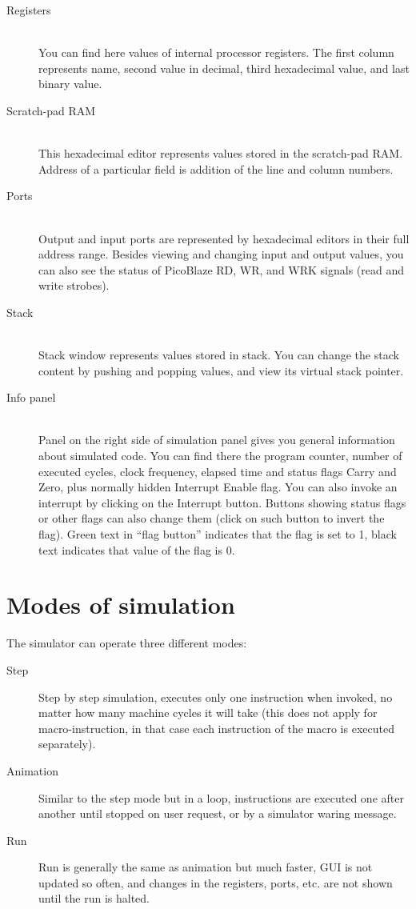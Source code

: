     \begin{description}
        \item [Registers]~\\
            You can find here values of internal processor registers. The first column represents name, second value in decimal, third hexadecimal value, and last binary value.
        \item [Scratch-pad RAM]~\\
            This hexadecimal editor represents values stored in the scratch-pad RAM. Address of a particular field is addition of the line and column numbers.
        \item [Ports]~\\
            Output and input ports are represented by hexadecimal editors in their full address range. Besides viewing and changing input and output values, you can also see the status of PicoBlaze RD, WR, and WRK signals (read and write strobes).
        \item [Stack]~\\
            Stack window represents values stored in stack. You can change the stack content by pushing and popping values, and view its virtual stack pointer.
        \item [Info panel]~\\
            Panel on the right side of simulation panel gives you general information about simulated code. You can find there the program counter, number of executed cycles, clock frequency, elapsed time and status flags Carry and Zero, plus normally hidden Interrupt Enable flag. You can also invoke an interrupt by clicking on the Interrupt button. Buttons showing status flags or other flags can also change them (click on such button to invert the flag). Green text in ``flag button'' indicates that the flag is set to 1, black text indicates that value of the flag is 0.
    \end{description}

\section{Modes of simulation}
    The simulator can operate three different modes:
    \begin{description}
        \item [Step]
            Step by step simulation, executes only one instruction when invoked, no matter how many machine cycles it will take (this does not apply for macro-instruction, in that case each instruction of the macro is executed separately).
        \item [Animation]
            Similar to the step mode but in a loop, instructions are executed one after another until stopped on user request, or by a simulator waring message.
        \item [Run]
            Run is generally the same as animation but much faster, GUI is not updated so often, and changes in the registers, ports, etc. are not shown until the run is halted.
    \end{description}


